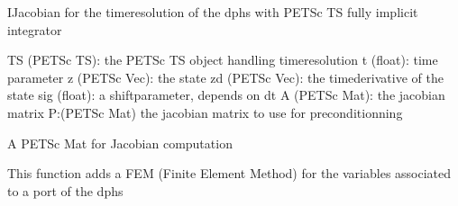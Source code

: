 \documentclass[letterpaper,10pt,english]{sphinxmanual}
\begin{document}
\begin{fulllineitems}

\begin{fulllineitems}
\label{\detokenize{scrimp:scrimp.dphs.DPHS.IJacobian}}
\pysigstartsignatures
\pysiglinewithargsret
{}
{\sphinxparamcomma {}\sphinxparamcomma {}\sphinxparamcomma {}\sphinxparamcomma {}\sphinxparamcomma {}\sphinxparamcomma {}}
{}
\pysigstopsignatures
\sphinxAtStartPar
IJacobian for the time\sphinxhyphen{}resolution of the dphs with PETSc TS fully implicit integrator
\begin{description}
\sphinxAtStartPar
TS (PETSc TS): the PETSc TS object handling time\sphinxhyphen{}resolution
t (float): time parameter
z (PETSc Vec): the state
zd (PETSc Vec): the time\sphinxhyphen{}derivative of the state
sig (float): a shift\sphinxhyphen{}parameter, depends on dt
A (PETSc Mat): the jacobian matrix
P:(PETSc Mat) the jacobian matrix to use for pre\sphinxhyphen{}conditionning

\end{description}

\end{fulllineitems}


\begin{fulllineitems}
\label{\detokenize{scrimp:scrimp.dphs.DPHS.J}}
\pysigstartsignatures
\pysigline
{}
\pysigstopsignatures
\sphinxAtStartPar
A PETSc Mat for Jacobian computation

\end{fulllineitems}


\begin{fulllineitems}
\label{\detokenize{scrimp:scrimp.dphs.DPHS.add_FEM}}
\pysigstartsignatures
\pysiglinewithargsret
{}
{}
{}
\pysigstopsignatures
\sphinxAtStartPar
This function adds a FEM (Finite Element Method) for the variables associated to a port of the dphs


\end{fulllineitems}
\end{fulllineitems}
\end{document}
